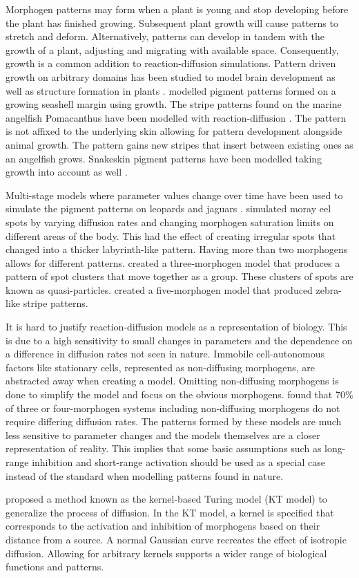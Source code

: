 Morphogen patterns may form when a plant is young and stop developing before the plant has finished growing. Subsequent plant growth will cause patterns to stretch and deform. Alternatively, patterns can develop in tandem with the growth of a plant, adjusting and migrating with available space. Consequently, growth is a common addition to reaction-diffusion simulations. Pattern driven growth on arbitrary domains has been studied to model brain development \citep{lefevre2010} as well as structure formation in plants \citep{harrison2002, holloway2007}. \citet{fowler1992} modelled pigment patterns formed on a growing seashell margin using growth. The stripe patterns found on the marine angelfish Pomacanthus have been modelled with reaction-diffusion \citep{kondo1995}. The pattern is not affixed to the underlying skin allowing for pattern development alongside animal growth. The pattern gains new stripes that insert between existing ones as an angelfish grows. Snakeskin pigment patterns have been modelled taking growth into account as well \citep{murray1991}.

Multi-stage models where parameter values change over time have been used to simulate the pigment patterns on leopards and jaguars \citep{liu2006}. \citet{malheiros2017} simulated moray eel spots by varying diffusion rates and changing morphogen saturation limits on different areas of the body. This had the effect of creating irregular spots that changed into a thicker labyrinth-like pattern. Having more than two morphogens allows for different patterns. \citet{schenk2000} created a three-morphogen model that produces a pattern of spot clusters that move together as a group. These clusters of spots are known as quasi-particles. \citet{meinhardt1982} created a five-morphogen model that produced zebra-like stripe patterns.

It is hard to justify reaction-diffusion models as a representation of biology. This is due to a high sensitivity to small changes in parameters and the dependence on a difference in diffusion rates not seen in nature. Immobile cell-autonomous factors like stationary cells, represented as non-diffusing morphogens, are abstracted away when creating a model. Omitting non-diffusing morphogens is done to simplify the model and focus on the obvious morphogens. \citet{marcon2016} found that 70\% of three or four-morphogen systems including non-diffusing morphogens do not require differing diffusion rates. The patterns formed by these models are much less sensitive to parameter changes and the models themselves are a closer representation of reality. This implies that some basic assumptions such as long-range inhibition and short-range activation should be used as a special case instead of the standard when modelling patterns found in nature.

\citet{kondo2017} proposed a method known as the kernel-based Turing model (KT model) to generalize the process of diffusion. In the KT model, a kernel is specified that corresponds to the activation and inhibition of morphogens based on their distance from a source. A normal Gaussian curve recreates the effect of isotropic diffusion. Allowing for arbitrary kernels supports a wider range of biological functions and patterns.

